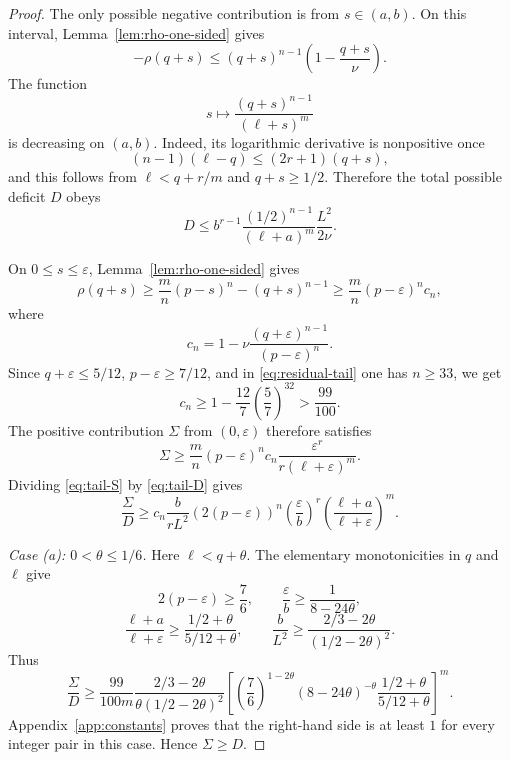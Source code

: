 \documentclass[11pt]{article}
\begin{document}
\begin{proof}
The only possible negative contribution is from $s\in(a,b)$.  On this interval, Lemma~\ref{lem:rho-one-sided} gives
\[
        -\rho(q+s)\le (q+s)^{n-1}\left(1-\frac{q+s}{\nu}\right).
\]
The function
\[
        s\mapsto \frac{(q+s)^{n-1}}{(\ell+s)^m}
\]
is decreasing on $(a,b)$.  Indeed, its logarithmic derivative is nonpositive once
\[
        (n-1)(\ell-q)\le(2r+1)(q+s),
\]
and this follows from $\ell<q+r/m$ and $q+s\ge1/2$.
Therefore the total possible deficit $D$ obeys
\begin{equation}\label{eq:tail-D}
        D\le b^{r-1}\frac{(1/2)^{n-1}}{(\ell+a)^m}\frac{L^2}{2\nu}.
\end{equation}

On $0\le s\le\varepsilon$, Lemma~\ref{lem:rho-one-sided} gives
\[
        \rho(q+s)\ge \frac mn(p-s)^n-(q+s)^{n-1}
        \ge \frac mn(p-\varepsilon)^n c_n,
\]
where
\[
        c_n=1-\nu\frac{(q+\varepsilon)^{n-1}}{(p-\varepsilon)^n}.
\]
Since $q+\varepsilon\le5/12$, $p-\varepsilon\ge7/12$, and in \eqref{eq:residual-tail} one has $n\ge33$, we get
\[
        c_n\ge1-\frac{12}{7}\left(\frac57\right)^{32}>\frac{99}{100}.
\]
The positive contribution $\Sigma$ from $(0,\varepsilon)$ therefore satisfies
\begin{equation}\label{eq:tail-S}
        \Sigma\ge \frac mn(p-\varepsilon)^n c_n
        \frac{\varepsilon^r}{r(\ell+\varepsilon)^m}.
\end{equation}
Dividing \eqref{eq:tail-S} by \eqref{eq:tail-D} gives
\begin{equation}\label{eq:tail-ratio}
        \frac{\Sigma}{D}
        \ge
        c_n\frac{b}{rL^2}
        \left(2(p-\varepsilon)\right)^n
        \left(\frac{\varepsilon}{b}\right)^r
        \left(\frac{\ell+a}{\ell+\varepsilon}\right)^m .
\end{equation}

\smallskip
\noindent\emph{Case (a): $0<\theta\le1/6$.}
Here $\ell<q+\theta$.  The elementary monotonicities in $q$ and $\ell$ give
\[
        2(p-\varepsilon)\ge\frac76,
        \qquad
        \frac{\varepsilon}{b}\ge\frac{1}{8-24\theta},
\]
\[
        \frac{\ell+a}{\ell+\varepsilon}
        \ge\frac{1/2+\theta}{5/12+\theta},
        \qquad
        \frac{b}{L^2}\ge\frac{2/3-2\theta}{(1/2-2\theta)^2}.
\]
Thus
\begin{equation}\label{eq:case-a-ratio}
        \frac{\Sigma}{D}
        \ge
        \frac{99}{100m}
        \frac{2/3-2\theta}{\theta(1/2-2\theta)^2}
        \left[
        \left(\frac76\right)^{1-2\theta}
        (8-24\theta)^{-\theta}
        \frac{1/2+\theta}{5/12+\theta}
        \right]^m .
\end{equation}
Appendix~\ref{app:constants} proves that the right-hand side is at least $1$ for every integer pair in this case.  Hence $\Sigma\ge D$.


\end{proof}
\end{document}
